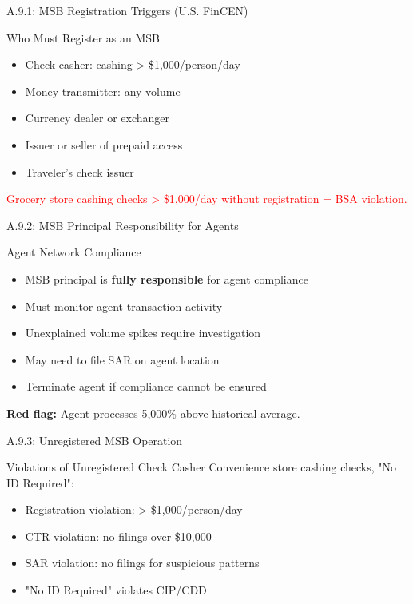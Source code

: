 \documentclass{beamer}
\begin{document}
	
	\begin{frame}{A.9.1: MSB Registration Triggers (U.S. FinCEN)}
		\begin{block}{Who Must Register as an MSB}
			\begin{itemize}
				\item Check casher: cashing > \$1,000/person/day
				\item Money transmitter: any volume
				\item Currency dealer or exchanger
				\item Issuer or seller of prepaid access
				\item Traveler's check issuer
			\end{itemize}
		\end{block}
		\textcolor{red}{Grocery store cashing checks > \$1,000/day without registration = BSA violation.}
	\end{frame}
	
	\begin{frame}{A.9.2: MSB Principal Responsibility for Agents}
		\begin{block}{Agent Network Compliance}
			\begin{itemize}
				\item MSB principal is \textbf{fully responsible} for agent compliance
				\item Must monitor agent transaction activity
				\item Unexplained volume spikes require investigation
				\item May need to file SAR on agent location
				\item Terminate agent if compliance cannot be ensured
			\end{itemize}
		\end{block}
		\textbf{Red flag:} Agent processes 5,000\% above historical average.
	\end{frame}
	
	\begin{frame}{A.9.3: Unregistered MSB Operation}
		\begin{block}{Violations of Unregistered Check Casher}
			Convenience store cashing checks, "No ID Required":
			\begin{itemize}
				\item Registration violation: > \$1,000/person/day
				\item CTR violation: no filings over \$10,000
				\item SAR violation: no filings for suspicious patterns
				\item "No ID Required" violates CIP/CDD
			\end{itemize}
		\end{block}
	\end{frame}
	
\end{document}
